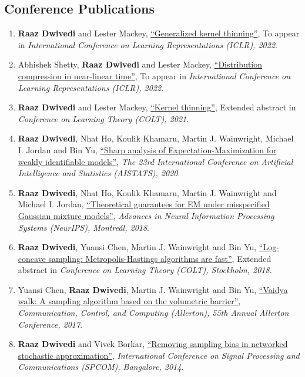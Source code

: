 \documentclass[margin,centered]{res}
\newcommand{\ptitle}[1]{``#1''}
\begin{document}
\begin{resume}
\section{\sc Conference Publications}

\begin{enumerate}[label={C\arabic*.},leftmargin=*]
\item \textbf{Raaz Dwivedi} and Lester Mackey, \href{https://arxiv.org/abs/2110.01593}{\ptitle{{Generalized kernel thinning}}}, To appear in \textit{International Conference on Learning Representations (ICLR), 2022}.
\item Abhishek Shetty, \textbf{Raaz Dwivedi} and Lester Mackey, \href{https://arxiv.org/abs/2111.07941}{\ptitle{{Distribution compression in near-linear time}}},  To appear in \textit{International Conference on Learning Representations (ICLR), 2022}.
\item \textbf{Raaz Dwivedi} and Lester Mackey, \href{https://arxiv.org/abs/2105.05842}{\ptitle{{Kernel thinning}}}, Extended abstract in \emph{Conference
on Learning Theory (COLT), 2021}.
\item \textbf{Raaz Dwivedi}\eqc, {Nhat Ho}\eqc, Koulik Khamaru\eqc, Martin
J. Wainwright, Michael I. Jordan and Bin Yu, \href{https://arxiv.org/pdf/1902.00194.pdf} {\ptitle{Sharp analysis of Expectation-Maximization for weakly identifiable models}},  \emph{ The 23rd International Conference on Artificial Intelligence and Statistics (AISTATS), 2020}.
\item \textbf{Raaz Dwivedi}\eqc, {Nhat Ho}\eqc, Koulik Khamaru\eqc,
Martin
J. Wainwright and
Michael I. Jordan, \href{https://people.eecs.berkeley.edu/~minhnhat/EM_misspecified_unified.pdf}
{\ptitle{Theoretical guarantees for EM under misspecified Gaussian mixture
models}},
\emph{Advances in Neural Information Processing Systems (NeurIPS), Montre{\'a}l, 2018}.
\item \textbf{Raaz Dwivedi}\eqc, Yuansi Chen\eqc, Martin
J. Wainwright and Bin Yu, \href{https://jmlr.csail.mit.edu/papers/volume20/19-306/19-306.pdf}
{
\ptitle{Log-concave sampling:
Metropolis-Hastings algorithms are fast}}, Extended abstract in \emph{Conference
on Learning
Theory (COLT), Stockholm, 2018}. 
\item Yuansi Chen\eqc, \textbf{Raaz Dwivedi}\eqc, Martin
J. Wainwright and Bin Yu, \href{https://jmlr.org/papers/volume19/18-158/18-158.pdf}
{\ptitle{Vaidya walk: A sampling algorithm based on the volumetric barrier}},
\textit{Communication, Control, and Computing (Allerton),
55th Annual Allerton Conference, 2017}.
\item \textbf{Raaz Dwivedi} and Vivek Borkar, \href{https://ieeexplore.ieee.org/abstract/document/6983986/}
{\ptitle{Removing sampling bias in networked stochastic approximation}},
\textit{International
Conference on Signal Processing and Communications (SPCOM), Bangalore, 2014}.
\end{enumerate}


\end{resume}
\end{document}
